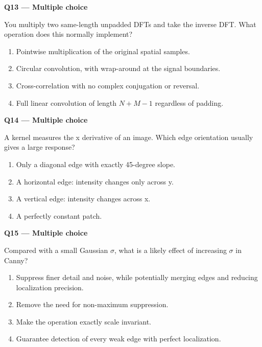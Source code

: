 \documentclass[11pt,a4paper]{article}
\begin{document}
\par\vspace{12pt}
\begin{minipage}{\linewidth}
\textbf{Q13 — Multiple choice}\par\smallskip
You multiply two same-length unpadded DFTs and take the inverse DFT. What operation does this normally implement?
\begin{enumerate}[label=\textbf{\Alph*.}]
\item Pointwise multiplication of the original spatial samples.
\item Circular convolution,\allowbreak{} with wrap-around at the signal boundaries.
\item Cross-correlation with no complex conjugation or reversal.
\item Full linear convolution of length \(N+M-1\) regardless of padding.
\end{enumerate}
\end{minipage}
\par\vspace{12pt}
\begin{minipage}{\linewidth}
\textbf{Q14 — Multiple choice}\par\smallskip
A kernel measures the x derivative of an image. Which edge orientation usually gives a large response?
\begin{enumerate}[label=\textbf{\Alph*.}]
\item Only a diagonal edge with exactly 45-degree slope.
\item A horizontal edge: intensity changes only across y.
\item A vertical edge: intensity changes across x.
\item A perfectly constant patch.
\end{enumerate}
\end{minipage}
\par\vspace{12pt}
\begin{minipage}{\linewidth}
\textbf{Q15 — Multiple choice}\par\smallskip
Compared with a small Gaussian \(\sigma\),\allowbreak{} what is a likely effect of increasing \(\sigma\) in Canny?
\begin{enumerate}[label=\textbf{\Alph*.}]
\item Suppress finer detail and noise,\allowbreak{} while potentially merging edges and reducing localization precision.
\item Remove the need for non-maximum suppression.
\item Make the operation exactly scale invariant.
\item Guarantee detection of every weak edge with perfect localization.
\end{enumerate}
\end{minipage}
\end{document}
